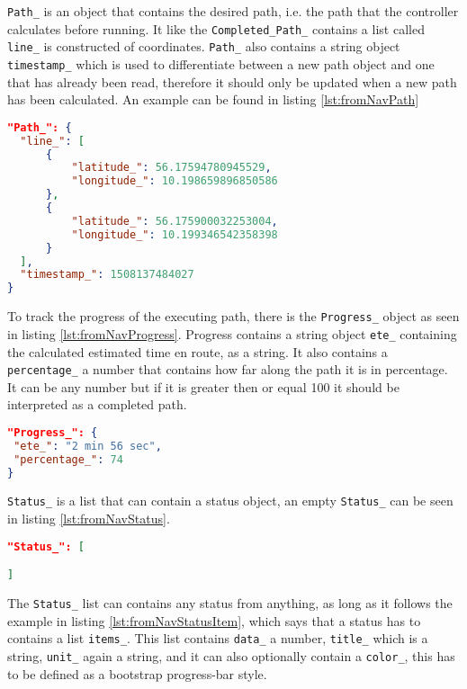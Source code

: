 \texttt{Path_} is an object that contains the desired path, i.e. the path that the controller calculates before running. It like the \texttt{Completed_Path_} contains a list called \texttt{line_} is constructed of coordinates. \texttt{Path_} also contains a string object \texttt{timestamp_} which is used to differentiate between a new path object and one that has already been read, therefore it should only be updated when a new path has been calculated. An example can be found in listing \ref{lst:fromNavPath}

\begin{lstlisting}[caption = {Example of a Path_ object in fromNav.json}, captionpos=b, label={lst:fromNavPath}, language=json,firstnumber=1]
"Path_": {
  "line_": [
      {
          "latitude_": 56.17594780945529,
          "longitude_": 10.198659896850586
      },
      {
          "latitude_": 56.175900032253004,
          "longitude_": 10.199346542358398
      }
  ],
  "timestamp_": 1508137484027
}
\end{lstlisting}

To track the progress of the executing path, there is the \texttt{Progress_} object as seen in listing \ref{lst:fromNavProgress}.
Progress contains a string object \texttt{ete_} containing the calculated estimated time en route, as a string. It also contains a \texttt{percentage_} a number that contains how far along the path it is in percentage. It can be any number but if it is greater then or equal 100 it should be interpreted as a completed path.

\begin{lstlisting}[caption = {Example of a Progress_ object in fromNav.json}, captionpos=b, label={lst:fromNavProgress}, language=json,firstnumber=1]
"Progress_": {
 "ete_": "2 min 56 sec",
 "percentage_": 74
}
\end{lstlisting}

\texttt{Status_} is a list that can contain a status object, an empty \texttt{Status_} can be seen in listing \ref{lst:fromNavStatus}.

\begin{lstlisting}[caption = {Example of a empty Status_ object in fromNav.json}, captionpos=b, label={lst:fromNavStatus}, language=json,firstnumber=1]
"Status_": [

]
\end{lstlisting}

The \texttt{Status_} list can contains any status from anything, as long as it follows the example in listing \ref{lst:fromNavStatusItem}, which says that a status has to contains a list \texttt{items_}. This list contains \texttt{data_} a number, \texttt{title_} which is a string, \texttt{unit_} again a string, and it can also optionally contain a \texttt{color_}, this has to be defined as a bootstrap progress-bar style.

